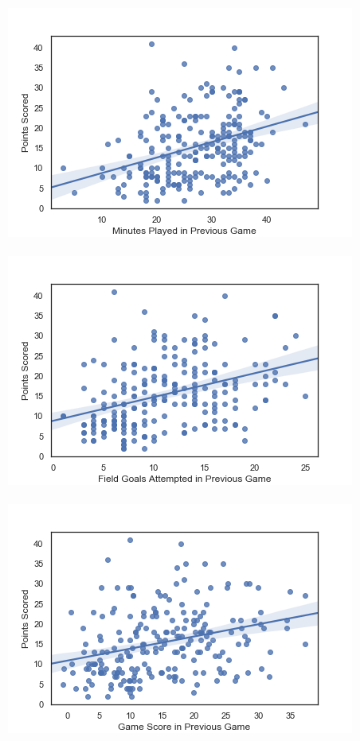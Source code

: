 \documentclass[a4paper,11pt,twoside]{article}
\begin{document}
\begin{figure} [h!]
  \centering
  \begin{subfigure}[b]{0.32\textwidth}
    \includegraphics[width=\textwidth]{../mp_pts.png}
    \label{fig:4}
  \end{subfigure}
  \begin{subfigure}[b]{0.32\textwidth}
    \includegraphics[width=\textwidth]{../fga_pts.png}
    \label{fig:5}
  \end{subfigure}
  \begin{subfigure}[b]{0.32\textwidth}
    \includegraphics[width=\textwidth]{../gmsc_pts.png}
    \label{fig:6}
  \end{subfigure}
  \label{fig:7}
\end{figure}
\end{document}
